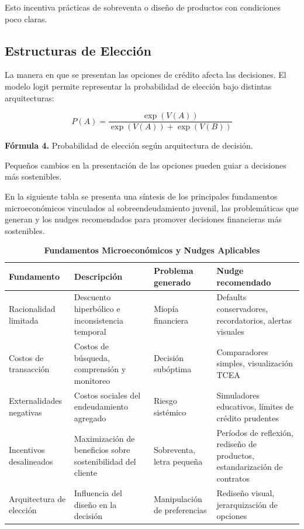 \documentclass[10pt]{article}
\begin{document}
\begin{multicols}{2}
Esto incentiva prácticas de sobreventa o diseño de productos con condiciones poco claras.

\subsection{Estructuras de Elección}

La manera en que se presentan las opciones de crédito afecta las decisiones. El modelo logit permite representar la probabilidad de elección bajo distintas arquitecturas:

\begin{equation}
P(A) = \frac{\exp(V(A))}{\exp(V(A)) + \exp(V(B))}
\end{equation}

\begin{center}
\small\textbf{Fórmula 4.} Probabilidad de elección según arquitectura de decisión.
\end{center}

Pequeños cambios en la presentación de las opciones pueden guiar a decisiones más sostenibles.

En la siguiente tabla se presenta una síntesis de los principales fundamentos microeconómicos vinculados al sobreendeudamiento juvenil, las problemáticas que generan y los nudges recomendados para promover decisiones financieras más sostenibles.


\begin{table}[H]
    \centering
    \caption{\textbf{Fundamentos Microeconómicos y Nudges Aplicables}}
    \begin{tabular}{p{1.5 cm}p{2 cm}p{1.4 cm}p{1.6 cm}}
        \hline
            \textbf{Fundamento} & \textbf{Descripción} & \textbf{Problema generado} & \textbf{Nudge recomendado} \\
            \hline
            Racionalidad limitada & Descuento hiperbólico e inconsistencia temporal & Miopía financiera & Defaults conservadores, recordatorios, alertas visuales \\
            \hline
            Costos de transacción & Costos de búsqueda, comprensión y monitoreo & Decisión subóptima & Comparadores simples, visualización TCEA \\
            \hline
            Externalidades negativas & Costos sociales del endeudamiento agregado & Riesgo sistémico & Simuladores educativos, límites de crédito prudentes \\
            \hline
            Incentivos desalineados & Maximización de beneficios sobre sostenibilidad del cliente & Sobreventa, letra pequeña & Períodos de reflexión, rediseño de productos, estandarización de contratos \\
            \hline
            Arquitectura de elección & Influencia del diseño en la decisión & Manipulación de preferencias & Rediseño visual, jerarquización de opciones \\
            \hline
        \end{tabular}
        \label{tab:fundamentos-nudges}
\end{table}



\end{multicols}
\end{document}
